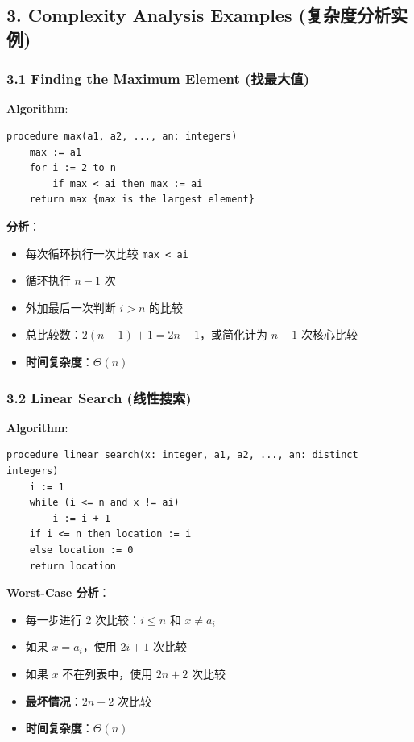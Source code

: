 \documentclass[10pt,a4paper,openany]{ctexbook}
\theoremstyle{definition}
\theoremstyle{remark}
\begin{document}
\subsection{3. Complexity Analysis Examples (复杂度分析实例)}

\subsubsection{3.1 Finding the Maximum Element (找最大值)}

\textbf{Algorithm}:
{\footnotesize\begin{verbatim}
procedure max(a1, a2, ..., an: integers)
    max := a1
    for i := 2 to n
        if max < ai then max := ai
    return max {max is the largest element}
\end{verbatim}}

\textbf{分析}：
\begin{itemize}
\item 每次循环执行一次比较 \texttt{max < ai}
\item 循环执行 $n-1$ 次
\item 外加最后一次判断 $i > n$ 的比较
\item 总比较数：$2(n-1) + 1 = 2n - 1$，或简化计为 $n-1$ 次核心比较
\item \textbf{时间复杂度}：$\Theta(n)$

\end{itemize}

\subsubsection{3.2 Linear Search (线性搜索)}

\textbf{Algorithm}:
{\footnotesize\begin{verbatim}
procedure linear search(x: integer, a1, a2, ..., an: distinct integers)
    i := 1
    while (i <= n and x != ai)
        i := i + 1
    if i <= n then location := i
    else location := 0
    return location
\end{verbatim}}

\textbf{Worst-Case 分析}：
\begin{itemize}
\item 每一步进行 2 次比较：$i \leq n$ 和 $x \neq a_i$
\item 如果 $x = a_i$，使用 $2i + 1$ 次比较
\item 如果 $x$ 不在列表中，使用 $2n + 2$ 次比较
\item \textbf{最坏情况}：$2n + 2$ 次比较
\item \textbf{时间复杂度}：$\Theta(n)$

\end{itemize}
\end{document}
